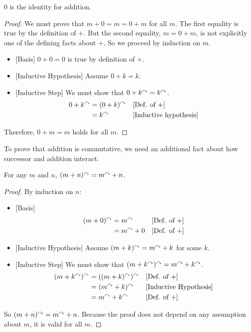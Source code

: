 \begin{fact}\label{lem:AddZero}
  $0$ is the identity for addition.

\begin{proof}
  We must prove that $m+0 = m = 0 + m$ for all $m$. The first equality is true by the definition of $+$.
  But the second equality, $m = 0 + m$, is not explicitly one of the defining facts about $+$. So we proceed by induction on $m$.
  \begin{itemize}
  \item{}[Basis] $0+0 = 0$ is true by definition of $+$.
  \item{}[Inductive Hypothesis] Assume $0 + k = k$.
  \item{}[Inductive Step] We must show that $0 + k^\curvearrowright = k^\curvearrowright$.
    \begin{align*}
      0 + k^\curvearrowright &= (0+k)^\curvearrowright &&\text{[Def. of $+$]}\\
      &= k^\curvearrowright &&\text{[Inductive hypothesis]}
    \end{align*}
  \end{itemize}
  Therefore, $0+m=m$ holds for all $m$.
\end{proof}
\end{fact}

\ipadbreak

To prove that addition is commutative, we need an additional fact
about how successor and addition interact.

\begin{lemma}\label{lem:AddSucc}
  For any $m$ and $n$, $(m + n)^\curvearrowright = m^\curvearrowright + n$.

 \begin{proof}
   By induction on $n$:
   \begin{itemize}
   \item{}[Basis]
     \begin{align*}
       (m + 0)^\curvearrowright &= m^\curvearrowright     &&\text{[Def. of $+$]}\\
       &= m^\curvearrowright + 0 &&\text{[Def. of $+$]}
     \end{align*}
   \item{}[Inductive Hypothesis]
    Assume $(m + k)^\curvearrowright = m^\curvearrowright + k$ for some $k$.
   \item{}[Inductive Step]
    We must show that $(m + k^\curvearrowright)^\curvearrowright = m^\curvearrowright + k^\curvearrowright$.
    \begin{align*}
      (m + k^\curvearrowright)^\curvearrowright &= ((m + k)^\curvearrowright)^\curvearrowright && \text{[Def. of $+$]}\\
                     &= (m^\curvearrowright + k)^\curvearrowright &&\text{[Inductive Hypothesis]}\\
                     &= m^\curvearrowright + k^\curvearrowright   &&\text{[Def. of $+$]}
    \end{align*}
   \end{itemize}
So $(m + n)^\curvearrowright = m^\curvearrowright + n$. Because the proof does not depend on any assumption about $m$, it is valid
for all $m$.
 \end{proof}
\end{lemma}

